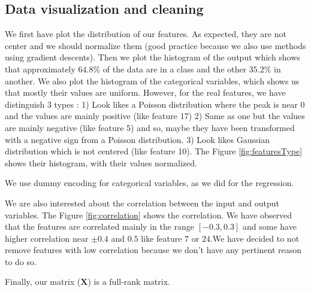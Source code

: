 \documentclass{article} %
\begin{document}
\subsection{Data visualization and cleaning}

We first have plot the distribution of our features. As expected, they are not center and we should normalize them (good practice because we also use methods using gradient descents). Then we plot the histogram of the output which shows that approximately $64.8\%$ of the data are in a class and the other $35.2\%$ in another. We also plot the histogram of the categorical variables, which shows us that mostly their values are uniform. However, for the real features, we have distinguish 3 types : 1) Look likes a Poisson distribution where the peak is near 0 and the values are mainly positive (like feature 17) 2) Same as one but the values are mainly negative (like feature 5) and so, maybe they have been transformed with a negative sign from a Poisson distribution. 3) Look likes Gaussian distribution which is not centered (like feature 10). The Figure \ref{fig:featuresType} shows their histogram, with their values normalized.

We use dummy encoding for categorical variables, as we did for the regression.

We are also interested about the correlation between the input and output variables. The Figure \ref{fig:correlation} shows the correlation. We have observed that the features are correlated mainly in the range $[-0.3,0.3]$ and some have higher correlation near $\pm0.4$ and $0.5$ like feature $7$ or $24$.We have decided to not remove features with low correlation because we don't have any pertinent reason to do so.

Finally, our matrix ($\mathbf{X}$) is a full-rank matrix.
\end{document}
